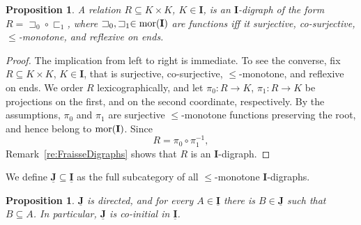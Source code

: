 \documentclass[12pt]{amsart}
\numberwithin{equation}{section}
\theoremstyle{plain}
\newtheorem{proposition}[theorem]{\bf Proposition}
\theoremstyle{definition}
\newcommand \Homeo{ \mbox{Homeo}}
\newcommand \sqsp{\sqsupset}
\newcommand \sqsb{\sqsubset}
\newcommand \mor{{\rm{mor}}}
\newcommand \IIb{\mathbf{I}}
\newcommand \JJb{\mathbf{J}}
\newcommand \IIub{\underline{\mathbf{I}}}
\newcommand \JJub{\underline{\mathbf{J}}}
\begin{document}


\begin{proposition}
\label{pr:CharI}
A relation $R \subseteq K \times K$, $K \in \IIb$, is an $\IIb$-digraph of the form $R=\sqsp_0 \circ \sqsb_1$, where $\sqsp_0, \sqsp_1 \in \mor(\IIb)$ are functions  iff it surjective, co-surjective, $\leq$-monotone, and reflexive on ends.
\end{proposition}

\begin{proof}
The implication from left to right is immediate. To see the converse, fix $R \subseteq K \times K$, $K \in \IIb$, that is surjective, co-surjective, $\leq$-monotone, and reflexive on ends. We order $R$ lexicographically, and let $\pi_0:R \to K$, $\pi_1:R \to K$ be projections on the first, and on the second coordinate, respectively. By the assumptions, $\pi_0$ and $\pi_1$ are surjective $\leq$-monotone functions preserving the root, and hence belong to $\mor(\IIb)$. Since
\[
R=\pi_0\circ\pi_1^{-1},
\]
Remark~\ref{re:FraisseDigraphs} shows that $R$ is an $\IIb$-digraph.
\end{proof}

We define  $\JJub \subseteq \IIub$ as the full subcategory of all $\leq$-monotone $\IIb$-digraphs. 
 
\begin{proposition}
\label{pr:IisDirected}
$\JJub$ is directed, and for every $A \in \IIub$ there is $B \in \JJub$  such that  $B \subseteq A$. In particular, $\JJub$ is co-initial in $\IIub$.
\end{proposition}
\end{document}
